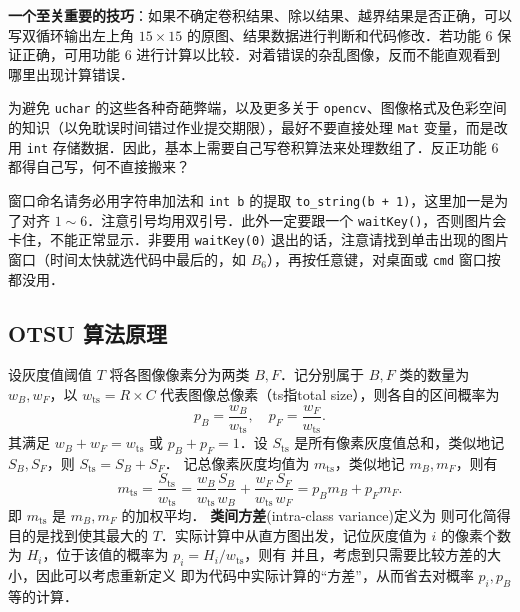 \documentclass[12pt,a4paper,twoside]{ctexart}
\numberwithin{figure}{section}
\numberwithin{equation}{section}
\begin{document}
\textbf{一个至关重要的技巧}：如果不确定卷积结果、除以结果、越界结果是否正确，可以写双循环输出左上角 $15\times 15$ 的原图、结果数据进行判断和代码修改．若功能 6 保证正确，可用功能 6 进行计算以比较．对着错误的杂乱图像，反而不能直观看到哪里出现计算错误．

为避免 \verb|uchar| 的这些各种奇葩弊端，以及更多关于 \verb|opencv|、图像格式及色彩空间的知识（以免耽误时间错过作业提交期限），最好不要直接处理 \verb|Mat| 变量，而是改用 \verb|int| 存储数据．因此，基本上需要自己写卷积算法来处理数组了．反正功能 6 都得自己写，何不直接搬来？


窗口命名请务必用字符串加法和 \verb|int b| 的提取 \verb|to_string(b + 1)|，这里加一是为了对齐 $1\sim 6$．注意引号均用双引号．此外一定要跟一个 \verb|waitKey()|，否则图片会卡住，不能正常显示．非要用 \verb|waitKey(0)| 退出的话，注意请找到单击出现的图片窗口（时间太快就选代码中最后的，如 $B_6$），再按任意键，对桌面或 \verb|cmd| 窗口按都没用．

\subsection{OTSU 算法原理}
设灰度值阈值 $T$ 将各图像像素分为两类 $B,F$．记分别属于 $B,F$ 类的数量为 $w_B,w_F$，以 $w_\text{ts}=R\times C$ 代表图像总像素（ts指total size），则各自的区间概率为
\[
    p_B=\frac{w_B}{w_\text{ts}},\quad p_F=\frac{w_F}{w_\text{ts}}.
\]
其满足 $w_B+w_F=w_\text{ts}$ 或 $p_B+p_F=1$．设 $S_\text{ts}$ 是所有像素灰度值总和，类似地记 $S_B,S_F$，则 $S_\text{ts}=S_B+S_F$．
记总像素灰度均值为 $m_\text{ts}$，类似地记 $m_B,m_F$，则有
\[
    m_\text{ts}=\frac{S_\text{ts}}{w_\text{ts}}=\frac{w_B}{w_\text{ts}}\frac{S_B}{w_B}+\frac{w_F}{w_\text{ts}}\frac{S_F}{w_F}=p_B m_B+p_Fm_F.
\]
即 $m_\text{ts}$ 是 $m_B,m_F$ 的加权平均．
\textbf{类间方差}(intra-class variance)定义为
则可化简得
目的是找到使其最大的 $T$．实际计算中从直方图出发，记位灰度值为 $i$ 的像素个数为 $H_i$，位于该值的概率为 $p_i={H_i}/{w_\text{ts}}$，则有
并且，考虑到只需要比较方差的大小，因此可以考虑重新定义
即为代码中实际计算的“方差”，从而省去对概率 $p_i,p_B$ 等的计算．
\end{document}
